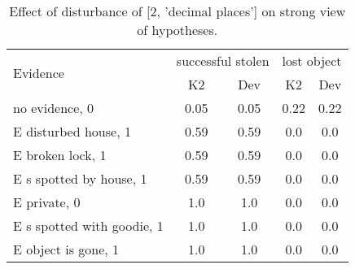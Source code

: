 \begin{table}\begin{tabular}{l|cc|cc}\toprule\multirow{2}{*}{Evidence} & \multicolumn{2}{c}{successful stolen}& \multicolumn{2}{c}{lost object}\\& {K2} & {Dev}& {K2} & {Dev}\\\midrule
no evidence, 0 & 0.05&0.05&0.22&0.22\\E disturbed house, 1 & 0.59&0.59&0.0&0.0\\E broken lock, 1 & 0.59&0.59&0.0&0.0\\E s spotted by house, 1 & 0.59&0.59&0.0&0.0\\E private, 0 & 1.0&1.0&0.0&0.0\\E s spotted with goodie, 1 & 1.0&1.0&0.0&0.0\\E object is gone, 1 & 1.0&1.0&0.0&0.0\\\bottomrule\end{tabular}\caption{Effect of disturbance of [2, 'decimal places'] on strong view of hypotheses.}\end{table}